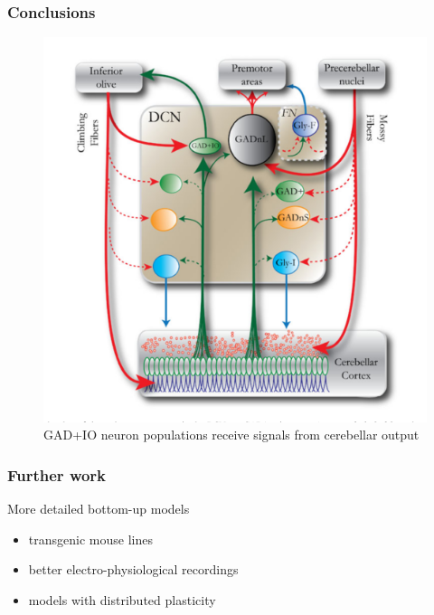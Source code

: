 \documentclass[10pt, compress]{beamer}
\begin{document}
\begin{frame}[fragile]
  \frametitle{Conclusions}
  \begin{figure}
    \includegraphics[scale=0.3]{images/uusisaari.png}
    \caption{GAD+IO neuron populations receive signals from cerebellar output \cite{Uusisaari2011}}
  \end{figure}
\end{frame}

\begin{frame}[fragile]
  \frametitle{Further work}
  More detailed bottom-up models
  \begin{itemize}
    \item transgenic mouse lines
    \item better electro-physiological recordings
    \item models with distributed plasticity
  \end{itemize}
\end{frame}

%   
\end{document}
